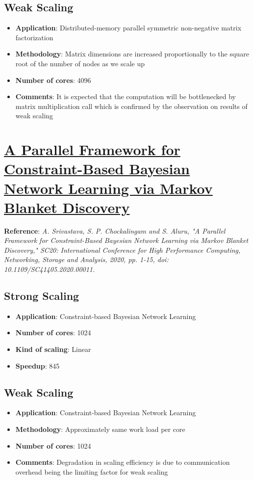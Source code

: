 \documentclass[11pt]{article}
\begin{document}
\subsection*{Weak Scaling}
\label{sec:org5789991}
\begin{itemize}
\item \textbf{Application}: Distributed-memory parallel symmetric non-negative matrix factorization 
\item \textbf{Methodology}: Matrix dimensions are increased proportionally to the square root of the number of nodes as we scale up
\item \textbf{Number of cores}: 4096
\item \textbf{Comments}:
It is expected that the computation will be bottlenecked by matrix multiplication call which is confirmed by the observation on results of weak scaling
\end{itemize}

\pagebreak
\section{\href{https://ieeexplore.ieee.org/document/9355320}{A Parallel Framework for Constraint-Based Bayesian Network Learning via Markov Blanket Discovery}}
\label{sec:org89e71b5}

\textbf{Reference}: \textit{A. Srivastava, S. P. Chockalingam and S. Aluru, "A Parallel Framework for Constraint-Based Bayesian Network Learning via Markov Blanket Discovery," SC20: International Conference for High Performance Computing, Networking, Storage and Analysis, 2020, pp. 1-15, doi: 10.1109/SC41405.2020.00011.}

\subsection*{Strong Scaling}
\label{sec:org314cd7e}
\begin{itemize}
\item \textbf{Application}: Constraint-based Bayesian Network Learning
\item \textbf{Number of cores}: 1024
\item \textbf{Kind of scaling}: Linear
\item \textbf{Speedup}: 845
\end{itemize}

\subsection*{Weak Scaling}
\label{sec:org6a153fd}
\begin{itemize}
\item \textbf{Application}: Constraint-based Bayesian Network Learning
\item \textbf{Methodology}: Approximately same work load per core
\item \textbf{Number of cores}: 1024
\item \textbf{Comments}:
Degradation in scaling efficiency is due to communication overhead being the limiting factor for weak scaling
\end{itemize}
\end{document}
